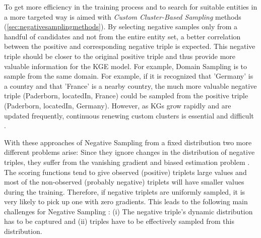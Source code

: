 To get more efficiency in the training process and to search for suitable entities in a more targeted way is aimed with  \textit{Custom Cluster-Based Sampling} methods (\autoref{sec:negativesamplingmethods}).
By selecting negative samples only from a handful of candidates and not from the entire entity set, a better correlation between the positive and corresponding negative triple is expected.
This negative triple should be closer to the original positive triple and thus provide more valuable information for the \ac{KGE} model.
For example, Domain Sampling \cite{domainSampling} is to sample from the same domain.
For example, if it is recognized that 'Germany' is a country and that 'France' is a nearby country, the much more valuable negative triple (Paderborn, locatedIn, France) could be sampled from the  positive triple (Paderborn, locatedIn, Germany).
However, as \acp{KG} grow rapidly and are updated frequently, continuous renewing custom clusters is essential and difficult \cite{qianunderstanding}.

With these approaches of Negative Sampling from a fixed distribution two more different problems arise:
Since they ignore changes in the distribution of negative triples, they suffer from the vanishing gradient and biased estimation problem \cite{zhang2021efficient}.
The scoring functions tend to give observed (positive) triplets large values and most of the non-observed (probably negative) triplets will have smaller values during the training.
Therefore, if negative triplets are uniformly sampled, it is very likely to pick up one with zero gradients.
This leads to the following main challenges for Negative Sampling \cite{zhang2021efficient}: 
(i) The negative triple's dynamic distribution has to be captured and 
(ii) triples have to be effectively sampled from this distribution.


